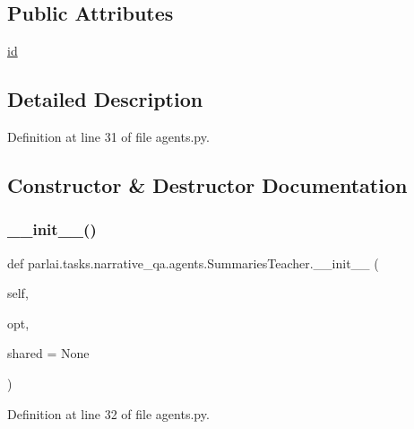 \subsection*{Public Attributes}
\begin{DoxyCompactItemize}
\item 
\hyperlink{classparlai_1_1tasks_1_1narrative__qa_1_1agents_1_1SummariesTeacher_a00d240ba5d5d8c7ba0257dbbbc2ba58c}{id}
\end{DoxyCompactItemize}


\subsection{Detailed Description}


Definition at line 31 of file agents.\+py.



\subsection{Constructor \& Destructor Documentation}
\mbox{\label{classparlai_1_1tasks_1_1narrative__qa_1_1agents_1_1SummariesTeacher_a833c2c54f6084e88dbe0a16151fc4a46}} 
\subsubsection{\texorpdfstring{\+\_\+\+\_\+init\+\_\+\+\_\+()}{\_\_init\_\_()}}
{\footnotesize\ttfamily def parlai.\+tasks.\+narrative\+\_\+qa.\+agents.\+Summaries\+Teacher.\+\_\+\+\_\+init\+\_\+\+\_\+ (\begin{DoxyParamCaption}\item[{}]{self,  }\item[{}]{opt,  }\item[{}]{shared = {\ttfamily None} }\end{DoxyParamCaption})}



Definition at line 32 of file agents.\+py.


